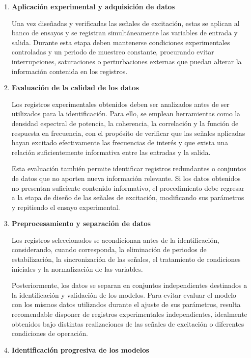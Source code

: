 \documentclass[11pt]{report}
\begin{document}
\begin{enumerate}
    
    \item \textbf{Aplicación experimental y adquisición de datos}
    
    Una vez diseñadas y verificadas las señales de excitación, estas se aplican al banco de ensayos y se registran simultáneamente las variables de entrada y salida. Durante esta etapa deben mantenerse condiciones experimentales controladas y un periodo de muestreo constante, procurando evitar interrupciones, saturaciones o perturbaciones externas que puedan alterar la información contenida en los registros.
    
    \item \textbf{Evaluación de la calidad de los datos}
    
    Los registros experimentales obtenidos deben ser analizados antes de ser utilizados para la identificación. Para ello, se emplean herramientas como la densidad espectral de potencia, la coherencia, la correlación y la función de respuesta en frecuencia, con el propósito de verificar que las señales aplicadas hayan excitado efectivamente las frecuencias de interés y que exista una relación suficientemente informativa entre las entradas y la salida.

Esta evaluación también permite identificar registros redundantes o conjuntos de datos que no aporten nueva información relevante. Si los datos obtenidos no presentan suficiente contenido informativo, el procedimiento debe regresar a la etapa de diseño de las señales de excitación, modificando sus parámetros y repitiendo el ensayo experimental.

    
    \item \textbf{Preprocesamiento y separación de datos}
   
    Los registros seleccionados se acondicionan antes de la identificación, considerando, cuando corresponda, la eliminación de periodos de estabilización, la sincronización de las señales, el tratamiento de condiciones iniciales y la normalización de las variables.

Posteriormente, los datos se separan en conjuntos independientes destinados a la identificación y validación de los modelos. Para evitar evaluar el modelo con los mismos datos utilizados durante el ajuste de sus parámetros, resulta recomendable disponer de registros experimentales independientes, idealmente obtenidos bajo distintas realizaciones de las señales de excitación o diferentes condiciones de operación.


    \item \textbf{Identificación progresiva de los modelos}
    

\end{enumerate}
\end{document}
